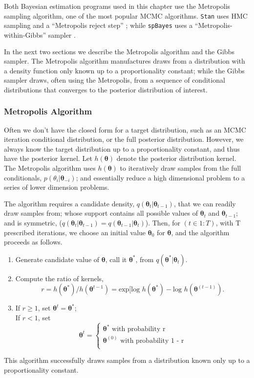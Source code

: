 Both Bayesian estimation programs used in this chapter use the Metropolis sampling algorithm, one of the most popular MCMC algorithms. \verb|Stan| uses HMC sampling and a ``Metropolis reject step'' \citep{STANtheMan}; while \verb|spBayes| uses a ``Metropolis-within-Gibbs'' sampler \citep{Finley2013}. 

In the next two sections we describe the Metropolis algorithm and the Gibbs sampler. The Metropolis algorithm manufactures draws from a distribution with a density function only known up to a proportionality constant; while the Gibbs sampler draws, often using the Metropolis, from a sequence of conditional distributions that converges to the posterior distribution of interest.

\subsubsection{Metropolis Algorithm } %

Often we don't have the closed form for a target distribution, such as an MCMC iteration conditional distribution, or the full posterior distribution. However, we always know the target distribution up to a proportionality constant, and thus have the posterior kernel. Let $h(\pmb{\theta})$ denote the posterior distribution kernel. The Metropolis algorithm uses $h(\pmb{\theta})$ to iteratively draw samples from the full conditionals, $p(\theta_{i}|\pmb{\theta}_{-i})$; and essentially reduce a high dimensional problem to a series of lower dimension problems. 

The algorithm requires a  candidate density, $q(\pmb{\theta}_{t}|\pmb{\theta}_{t-1})$, that we can readily draw samples from; whose support contains all possible values of $\pmb{\theta}_{t}$ and $\pmb{\theta}_{t-1}$; and is symmetric, ($q(\pmb{\theta}_{t}|\pmb{\theta}_{t-1}) = q(\pmb{\theta}_{t-1}|\pmb{\theta}_{t})$). Then, for $(t \in 1:T)$, with T prescribed iterations, we choose an initial value $\pmb{\theta}_{0}$ for $\pmb{\theta}$, and the algorithm proceeds as follows.
\begin{enumerate}
\item Generate candidate value of $\pmb{\theta}$, call it $\pmb{\theta}^{*}$, from $q(\pmb{\theta}^{*}|\pmb{\theta}_{t})$.
\item Compute the ratio of kernels,
$$ r=h(\pmb{\theta}^{*})/h(\pmb{\theta}^{t-1}) = \text{exp}[\text{log }h(\pmb{\theta}^{*}) - \text{log }h(\pmb{\theta}^{(t-1)}). $$
\item If $r \geq  1$, set $\pmb{\theta}^{t} = \pmb{\theta}^{*}$; \\
            If $r < 1$, set 
            \[ 
            \pmb{\theta}^{t} = 
            \begin{cases} 
            \pmb{\theta}^{*} \text{ with probability r} \\
            \pmb{\theta}^{(0)} \text{ with probability 1 - r} \\
            \end{cases}
            \]
  \end{enumerate}
This algorithm successfully draws samples from a distribution known only up to a proportionality constant.   

